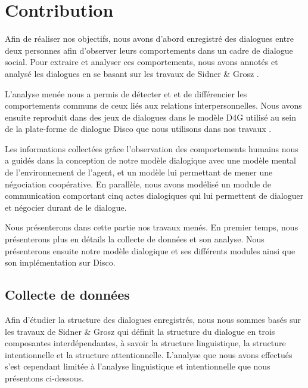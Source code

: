 \documentclass[a4paper,french]{article}
\begin{document}
\section{Contribution}
\label{contribution}

\par Afin de réaliser nos objectifs, nous avons d'abord enregistré des dialogues entre deux personnes afin d'observer leurs comportements dans un cadre de dialogue social. 
Pour extraire et analyser ces comportements, nous avons annotés et analysé les dialogues  en se basant sur les travaux de Sidner \& Grosz \cite{grosz1986attention}.
 \par L'analyse menée nous a permis de détecter et et de différencier les comportements communs de ceux liés aux relations interpersonnelles. Nous avons ensuite reproduit dans des jeux de dialogues dans le modèle D4G utilisé au sein de la plate-forme de dialogue Disco que nous utilisons dans nos travaux \cite{rich2009building}. 

\par Les informations collectées grâce l'observation des comportements humains nous a guidés dans la conception de notre modèle dialogique avec une modèle mental de l'environnement de l'agent, et un modèle lui permettant de mener une négociation coopérative. 
En parallèle, nous avons modélisé un module de communication comportant cinq actes dialogiques qui lui permettent de dialoguer et négocier durant de le dialogue. 
\par Nous présenterons dans cette partie nos travaux menés. En premier temps, nous présenterons plus en détails la collecte de données et son analyse. 
	Nous présenterons ensuite notre modèle dialogique et ses différents modules ainsi que son implémentation sur Disco. 

\subsection{Collecte de données}


Afin d'étudier la structure des dialogues enregistrés, nous nous sommes basés sur les travaux de Sidner \& Grosz \cite{grosz1986attention}  qui définit la structure du dialogue en trois composantes interdépendantes, à savoir la structure linguistique, la structure intentionnelle et la structure attentionnelle. L'analyse que nous avons effectués s'est cependant limitée à l'analyse linguistique et intentionnelle que nous présentons ci-dessous. 
\end{document}
